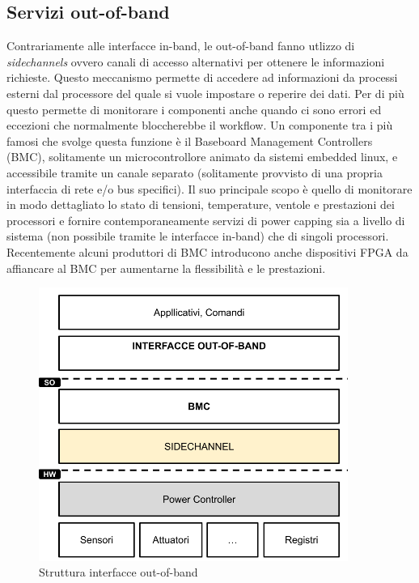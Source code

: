 \subsection{Servizi out-of-band}
Contrariamente alle interfacce in-band, le out-of-band fanno utlizzo di \emph{sidechannels} ovvero canali di accesso alternativi per ottenere le informazioni richieste. Questo meccanismo permette di accedere ad informazioni da processi esterni dal processore del quale si vuole impostare o reperire dei dati. Per di più questo permette di monitorare i componenti anche quando ci sono errori ed eccezioni che normalmente bloccherebbe il workflow. Un componente tra i più famosi che svolge questa funzione è il Baseboard Management Controllers (BMC), solitamente un microcontrollore animato da sistemi embedded linux, e accessibile tramite un canale separato (solitamente provvisto di una propria interfaccia di rete e/o bus specifici). Il suo principale scopo è quello di monitorare in modo dettagliato lo stato di tensioni, temperature, ventole e prestazioni dei processori e fornire contemporaneamente servizi di power capping sia a livello di sistema (non possibile tramite le interfacce in-band) che di singoli processori.
Recentemente alcuni produttori di BMC introducono anche dispositivi FPGA da affiancare al BMC per aumentarne la flessibilità e le prestazioni.
\begin{figure}[H]
    \centering
    \includegraphics[width=0.9\textwidth]{img/out-of-band.png}
    \caption{Struttura interfacce out-of-band} 
    \label{fig:inband}
\end{figure}


